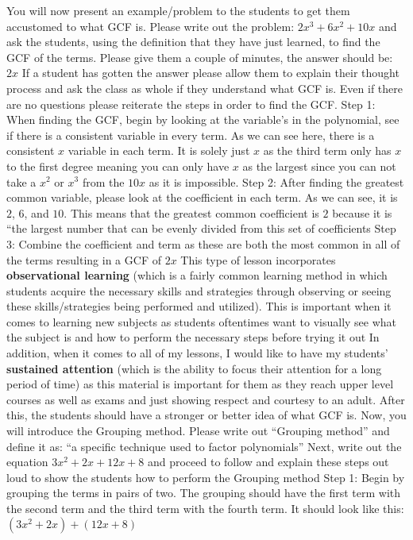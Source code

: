 \begin{outline}
    \1 You will now present an example/problem to the students to get them accustomed to what GCF is. Please write out the problem: $2x^3+6x^2+10x$ and ask the students, using the definition that they have just learned, to find the GCF of the terms.
        \2 Please give them a couple of minutes, the answer should be: $2x$
    \1 If a student has gotten the answer please allow them to explain their thought process and ask the class as whole if they understand what GCF is. Even if there are no questions please reiterate the steps in order to find the GCF.	
        \2 Step 1: When finding the GCF, begin by looking at the variable’s in the polynomial, see if there is a consistent variable in every term. As we can see here, there is a consistent $x$ variable in each term. It is solely just $x$ as the third term only has $x$ to the first degree meaning you can only have $x$ as the largest since you can not take a $x^2$ or $x^3$ from the $10x$ as it is impossible. 
        \2 Step 2: After finding the greatest common variable, please look at the coefficient in each term. As we can see, it is $2$, $6$, and $10$. This means that the greatest common coefficient is $2$ because it is “the largest number that can be evenly divided from this set of coefficients 
        \2 Step 3: Combine the coefficient and term as these are both the most common in all of the terms resulting in a GCF of $2x$
            \3 This type of lesson incorporates \textbf{observational learning} (which is a fairly common learning method in which students acquire the necessary skills and strategies through observing or seeing these skills/strategies being performed and utilized). This is important when it comes to learning new subjects as students oftentimes want to visually see what the subject is and how to perform the necessary steps before trying it out 
            \3 In addition, when it comes to all of my lessons, I would like to have my students' \textbf{sustained attention} (which is the ability to focus their attention for a long period of time) as this material is important for them as they reach upper level courses as well as exams and just showing respect and courtesy to an adult. 
    \1 After this, the students should have a stronger or better idea of what GCF is. Now, you will introduce the Grouping method. Please write out ``Grouping method'' and define it as: ``a specific technique used to factor polynomials''
    \1 Next, write out the equation $3x^2+2x+12x+8$ and proceed to follow and explain these steps out loud to show the students how to perform the Grouping method
        \2 Step 1: Begin by grouping the terms in pairs of two. The grouping should have the first term with the second term and the third term with the fourth term. It should look like this: $(3x^2+2x)+(12x+8)$

\end{outline}
